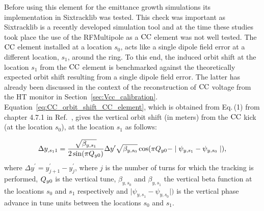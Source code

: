 Before using this element for the emittance growth simulations its implementation in Sixtracklib was tested. This check was important as Sixtracklib is a recently developed simulation tool and at the time these studies took place the use of the RFMultipole as a ${\mathrm{CC}}$ element was not well tested. The ${\mathrm{CC}}$ element installed at a location $s_0$, acts like a single dipole field error at a different location, $s_1$, around the ring. To this end, the induced orbit shift at the location $s_1$ from the ${\mathrm{CC}}$ element is benchmarked against the theoretically expected orbit shift resulting from a single dipole field error. The latter has already been discussed in the context of the reconstruction of ${\mathrm{CC}}$ voltage from the HT monitor in Section~\ref{sec:Vcc_calibration}. Equation~\eqref{eq:CC_orbit_shift_CC_element}, which is obtained from Eq.\,(1) from chapter 4.7.1 in Ref.~\cite{Chao:1490001}, gives the vertical orbit shift (in meters) from the ${\mathrm{CC}}$ kick (at the location $s_0$), at the location $s_1$ as follows:

\begin{equation}\label{eq:CC_orbit_shift_CC_element}
    \Delta y_{,s_11} = \frac{\sqrt{\beta_{y, s_1}}}{2 \sin(\pi {Q_{y0}})} \Delta y^\prime \sqrt{\beta_{y, s_0}} \cos(\pi {Q_{y0}} - \mid \psi_{y, s_1} - \psi_{y, s_0} \mid),
 \end{equation}
where $\Delta y^\prime=y^\prime_{j+1}-y^\prime_{j}$, where $j$ is the number of turns for which the tracking is performed, ${Q_{y0}}$ is the vertical tune, $\beta_{y, s_0}$ and $\beta_{y, s_1}$ the vertical beta function at the locations $s_0$ and $s_1$ respectively and $\mid \psi_{y, s_1} - \psi_{y, s_0} \mid)$ is the vertical phase advance in tune units between the locations $s_0$ and $s_1$.

